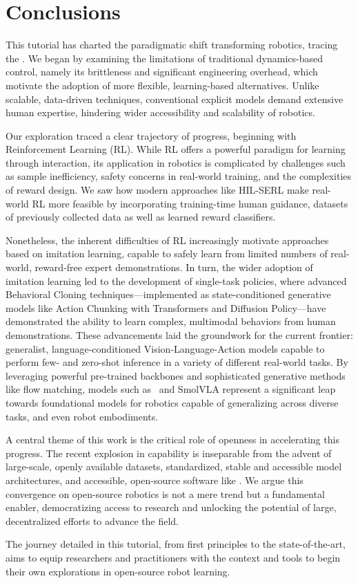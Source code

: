 \section{Conclusions}
\label{sec:conclusions}

This tutorial has charted the paradigmatic shift transforming robotics, tracing the . We began by examining the limitations of traditional dynamics-based control, namely its brittleness and significant engineering overhead, which motivate the adoption of more flexible, learning-based alternatives. Unlike scalable, data-driven techniques, conventional explicit models demand extensive human expertise, hindering wider accessibility and scalability of robotics.

Our exploration traced a clear trajectory of progress, beginning with Reinforcement Learning (RL). While RL offers a powerful paradigm for learning through interaction, its application in robotics is complicated by challenges such as sample inefficiency, safety concerns in real-world training, and the complexities of reward design. We saw how modern approaches like HIL-SERL make real-world RL more feasible by incorporating training-time human guidance, datasets of previously collected data as well as learned reward classifiers.

Nonetheless, the inherent difficulties of RL increasingly motivate approaches based on imitation learning, capable to safely learn from limited numbers of real-world, reward-free expert demonstrations. In turn, the wider adoption of imitation learning led to the development of single-task policies, where advanced Behavioral Cloning techniques---implemented as state-conditioned generative models like Action Chunking with Transformers and Diffusion Policy---have demonstrated the ability to learn complex, multimodal behaviors from human demonstrations. These advancements laid the groundwork for the current frontier: generalist, language-conditioned Vision-Language-Action models capable to perform few- and zero-shot inference in a variety of different real-world tasks. By leveraging powerful pre-trained backbones and sophisticated generative methods like flow matching, models such as \pizero~and SmolVLA represent a significant leap towards foundational models for robotics capable of generalizing across diverse tasks, and even robot embodiments.

A central theme of this work is the critical role of openness in accelerating this progress. The recent explosion in capability is inseparable from the advent of large-scale, openly available datasets, standardized, stable and accessible model architectures, and accessible, open-source software like \lerobot. We argue this convergence on open-source robotics is not a mere trend but a fundamental enabler, democratizing access to research and unlocking the potential of large, decentralized efforts to advance the field.

The journey detailed in this tutorial, from first principles to the state-of-the-art, aims to equip researchers and practitioners with the context and tools to begin their own explorations in open-source robot learning.